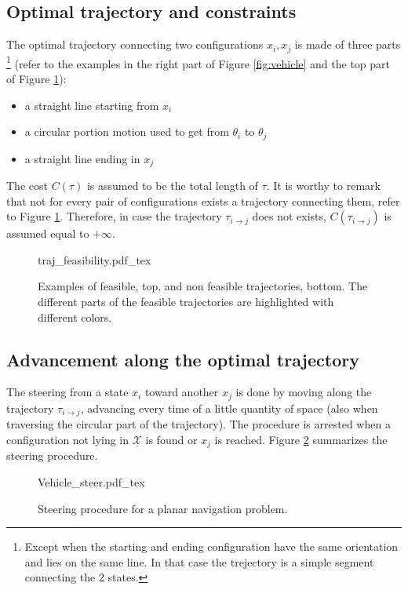 \subsection{Optimal trajectory and constraints}

The optimal trajectory connecting two configurations $x_i, x_j$ is made of three parts \footnote{Except when the starting and ending configuration have the same orientation and lies on the same line. In that case the trejectory is a simple segment connecting the 2 states.} (refer to the examples in the right part of Figure \ref{fig:vehicle} and the top part of Figure \ref{fig:traj_feas}):
\begin{itemize}
\item a straight line starting from $x_i$
\item a circular portion motion used to get from $\theta_i$ to $\theta_j$
\item a straight line ending in $x_j$
\end{itemize}
The cost $C(\tau)$ is assumed to be the total length of $\tau$. It is worthy to remark that not for every pair of configurations exists a trajectory connecting them, refer to Figure \ref{fig:traj_feas}. Therefore, in case the trajectory $\tau_{i \rightarrow j}$ does not exists, $C(\tau_{i \rightarrow j})$ is assumed equal to $+\infty$.

 \begin{figure}
	 \centering
 \def\svgwidth{0.65 \columnwidth}
 {traj_feasibility.pdf_tex} 
	 \caption{Examples of feasible, top, and non feasible trajectories, bottom. The different parts of the feasible trajectories are highlighted with different colors. }
 \label{fig:traj_feas}
 \end{figure}

\subsection{Advancement along the optimal trajectory}

The steering from a state $x_i$ toward another $x_j$ is done by moving along the trajectory $\tau_{i \rightarrow j}$, advancing every time of a little quantity of space (also when traversing the circular part of the trajectory).
The procedure is arrested when a configuration not lying in $\underline{\mathcal{X}}$ is found or $x_j$ is reached. Figure \ref{fig:vehicle_steer} summarizes the steering procedure.

 \begin{figure}
	 \centering
 \def\svgwidth{0.35 \columnwidth}
 {Vehicle_steer.pdf_tex} 
	 \caption{Steering procedure for a planar navigation problem.}
 \label{fig:vehicle_steer}
 \end{figure}

